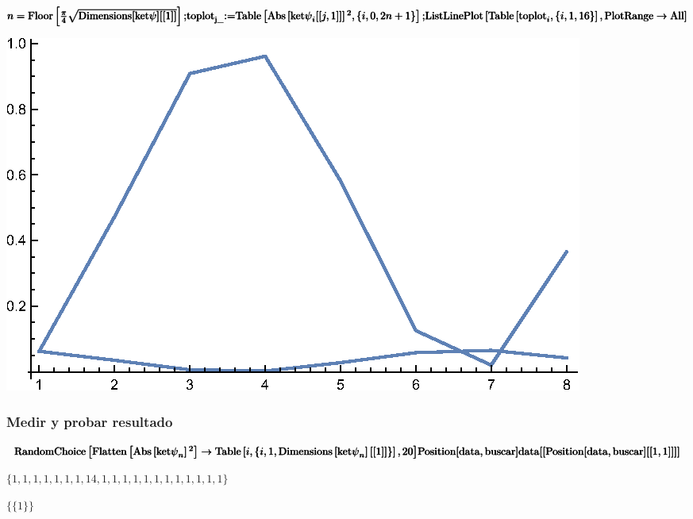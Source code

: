 \begin{doublespace}
\noindent\(\pmb{n=\text{Floor}\left[\frac{\pi }{4}\sqrt{\text{Dimensions}[\text{ket$\psi $}][[1]]}\right];}\\
\pmb{\text{toplot}_{\text{j$\_$}}\text{:=}\text{Table}\left[\text{Abs}\left[\text{ket$\psi $}_i[[j,1]]\right]{}^2,\{i,0,2n+1\}\right];}\\
\pmb{\text{ListLinePlot}\left[\text{Table}\left[\text{toplot}_i,\{i,1,16\}\right],\text{PlotRange}\to \text{All}\right]}\)
\end{doublespace}

\includegraphics{img/Grover-2_gr1.eps}

\subsubsection*{Medir y probar resultado}

\begin{doublespace}
\noindent\(\pmb{\text{RandomChoice}\left[\text{Flatten}\left[\text{Abs}\left[\text{ket$\psi $}_n\right]{}^2\right]\to \text{Table}\left[i,\left\{i,1,\text{Dimensions}\left[\text{ket$\psi
$}_n\right][[1]]\right\}\right],20\right]}\\
\pmb{\text{Position}[\text{data},\text{buscar}]}\\
\pmb{\text{data}[[\text{Position}[\text{data},\text{buscar}][[1,1]]]]}\)
\end{doublespace}

\begin{doublespace}
\noindent\(\{1,1,1,1,1,1,1,14,1,1,1,1,1,1,1,1,1,1,1,1\}\)
\end{doublespace}

\begin{doublespace}
\noindent\(\{\{1\}\}\)
\end{doublespace}

